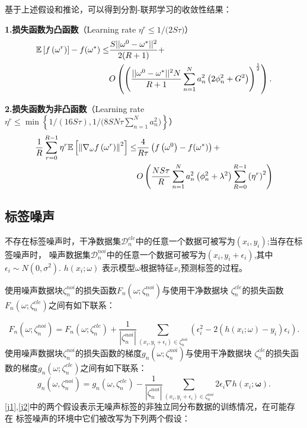 基于上述假设和推论，可以得到分割-联邦学习的收敛性结果：

\noindent \textbf{1.损失函数为凸函数}（Learning rate $\eta^r \leq 1/{(2 S\tau})$）
\begin{align}\label{bound-v2-gc-full2}
\mathbb{E}\left[f\left(\omega^{r}\right)\right]-f(\omega^*)\le& \frac{S||\omega^0-\omega^*||^2}{2(R+1)}+ \\\notag
&O\left(\left(\frac{||\omega^0-\omega^*||^2 N}{R+1}\sum_{n=1}^Na_n^2\left(2\phi_n^2+G^2\right)\right)^{\frac{1}{2}}\right).
\end{align}

\noindent \textbf{2.损失函数为非凸函数}（Learning rate $\eta^r \leq \min\left\{ {1}/{(16S\tau)}, {1}/{(8SN\tau\sum_{n=1}^Na_n^2})\right\}$）
\begin{align}\label{bound-v2-nc-full3}
\frac{1}{R}\sum_{r=0}^{R-1}\eta^r\mathbb{E}\left[\left\Vert\nabla_{\omega}f\left(\omega^{r}\right)\right\Vert^2\right]\leq& \frac{4}{R\tau}\left(f\left(\omega^{0}\right)-f(\omega^*)\right)+\\\notag
&O\left(\frac{NS\tau }{R} \sum_{n=1}^Na_n^2\left(\phi_n^2+\lambda^2\right)\sum_{R=0}^{R-1}\left(\eta^r\right)^2\right)
\end{align}

\subsection{标签噪声}
不存在标签噪声时，干净数据集$\mathcal{D}_n^{cle}$中的任意一个数据可被写为$(x_i,y_i)$;当存在标签噪声时，
噪声数据集$\mathcal{D}_n^{noi}$中的任意一个数据可被写为$(x_i,y_i+\epsilon_i)$,其中$\epsilon_i \sim N(0,\sigma^2)$. $h(x_i;\omega)$
表示模型$\omega$根据特征$x_i$预测标签的过程。

使用噪声数据块$\zeta_n^{noi}$的损失函数$F_n(\omega;\zeta_n^{noi})$与使用干净数据块
$\zeta_n^{cle}$的损失函数$F_n(\omega;\zeta_n^{cle})$之间有如下联系：

\begin{equation}
F_n\left(\omega;\zeta_n^{noi}\right)=F_n\left(\omega;\zeta_n^{cle}\right)
+\frac{1}{|\zeta_n^{noi}|}\sum_{\left(x_i,y_i+\epsilon_i\right)\in \zeta_n^{noi}}\left( \epsilon_i^2 - 2\left(h\left(x_i;\omega\right)-y_i\right)\epsilon_i \right).
\end{equation}
使用噪声数据块$\zeta_n^{noi}$的损失函数的梯度$g_n(\omega;\zeta_n^{noi})$与使用干净数据块
$\zeta_n^{cle}$的损失函数的梯度$g_n(\omega;\zeta_n^{cle})$之间有如下联系：
\begin{equation}\label{Gradient of clean loss}
g_n\left(\omega,\zeta_n^{noi}\right) 
=g_n\left(\omega,\zeta_n^{cle}\right)-\frac{1}{|\zeta_n^{noi}|}\sum_{\left(x_i,y_i+\epsilon_i\right)\in \zeta_n^{noi}}2\epsilon_i\nabla h\left(x_i;\boldsymbol{\omega}\right).
\end{equation}
\ref{j1},\ref{j2}中的两个假设表示无噪声标签的非独立同分布数据的训练情况，在可能存在
标签噪声的环境中它们被改写为下列两个假设：

